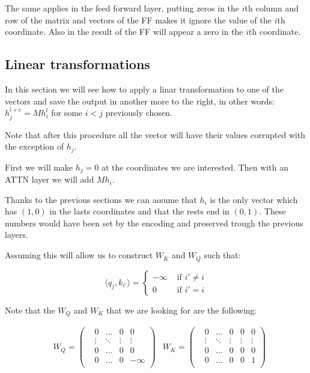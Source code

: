 The same applies in the feed forward layer, putting zeros in the $i$th column and row of the matrix and vectors of the FF makes it ignore the value of the $i$th coordinate. Also in the result of the FF will appear a zero in the $i$th coordinate.

\subsection*{Linear transformations}

In this section we will see how to apply a linar transformation to one of the vectors and save the output in another more to the right, in other words: $h_j^{l+c} = M h_i^l$ for some $i < j$ previously chosen.

Note that after this procedure all the vector will have their values corrupted with the exception of $h_j$.

\bigskip

First we will make $h_j = 0$ at the coordinates we are interested. Then with an ATTN layer we will add $M h_i$.

Thanks to the previous sections we can assume that $h_i$ is the only vector which has $(1,0)$ in the lasts coordinates and that the rests end in $(0,1)$. These numbers would have been set by the encoding and preserved trough the previous layers.

Assuming this will allow us to construct $W_K$ and $W_Q$ such that:

\[
\langle q_{j}, k_{i'} \rangle = \begin{cases}
    -\infty &\text{ if } i' \neq i \\
    0  &\text{ if } i' = i 
\end{cases}
\]

Note that the $W_Q$ and $W_K$ that we are looking for are the following:

\begin{align*}
    & W_Q = \left(\begin{matrix}
    &0      &\hdots &0      &0          \\
    &\vdots &\ddots &\vdots &\vdots     \\
    &0      &\hdots &0      &0          \\
    &0      &\hdots &0      &-\infty    \\
\end{matrix}\right)
    &W_K = \left(\begin{matrix}
    &0      &\hdots &0      &0      &0      \\
    &\vdots &\ddots &\vdots &\vdots &\vdots \\
    &0      &\hdots &0      &0      &0      \\
    &0      &\hdots &0      &0      &1      \\
\end{matrix}\right)
\end{align*}


